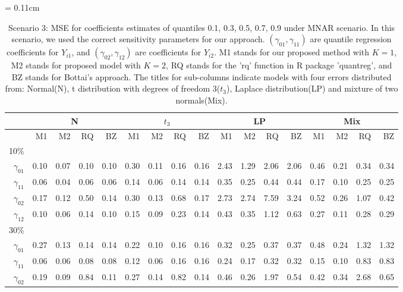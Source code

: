 \documentclass[useAMS,usenatbib,referee]{biom}
\begin{document}
  \begin{table}
\centering
    \caption{Scenario 3: MSE for coefficients estimates of quantiles 0.1, 0.3, 0.5, 0.7, 0.9 under MNAR scenario.
In this scenario, we used the correct sensitivity parameters for our approach.
$(\gamma_{01}, \gamma_{11})$ are quantile regression coefficients for $Y_{i1}$, and $(\gamma_{02}, \gamma_{12})$ are coefficients for $Y_{i2}$. M1 stands for our proposed method with $K = 1$, M2 stands for proposed model with $K = 2$, RQ stands for the 'rq' function in R package 'quantreg', and BZ stands for Bottai's approach.
The titles for sub-columns indicate models with four errors distributed from: Normal(N), t distribution with degrees of freedom 3($t_3$),
Laplace distribution(LP) and mixture of two normals(Mix).
}\label{tab:sim3}
    \vspace{10pt} \tabcolsep = 0.11cm
    \begin{tabular}{rrrrrrrrrrrrrrrrr}
      \hline
              & \multicolumn{4}{c}{N} & \multicolumn{4}{c}{$t_3$}   & \multicolumn{4}{c}{LP}   & \multicolumn{4}{c}{Mix}   \\
      \hline
           & M1                      & M2 & RQ & BZ   & M1                      & M2 & RQ & BZ   & M1                      & M2 & RQ & BZ   & M1                      & M2 & RQ & BZ \\
10\%  \\
$\gamma_{01}$ & 0.10 & 0.07 & 0.10 & 0.10 & 0.30 & 0.11 & 0.16 & 0.16 & 2.43 & 1.29 & 2.06 & 2.06 & 0.46 & 0.21 & 0.34 & 0.34 \\
$\gamma_{11}$ & 0.06 & 0.04 & 0.06 & 0.06 & 0.14 & 0.06 & 0.14 & 0.14 & 0.35 & 0.25 & 0.44 & 0.44 & 0.17 & 0.10 & 0.25 & 0.25 \\
$\gamma_{02}$ & 0.17 & 0.12 & 0.50 & 0.14 & 0.30 & 0.13 & 0.68 & 0.17 & 2.73 & 2.74 & 7.59 & 3.24 & 0.52 & 0.26 & 1.07 & 0.42 \\
$\gamma_{12}$ & 0.10 & 0.06 & 0.14 & 0.10 & 0.15 & 0.09 & 0.23 & 0.14 & 0.43 & 0.35 & 1.12 & 0.63 & 0.27 & 0.11 & 0.28 & 0.29 \\
30\% \\
$\gamma_{01}$ & 0.27 & 0.13 & 0.14 & 0.14 & 0.22 & 0.10 & 0.16 & 0.16 & 0.32 & 0.25 & 0.37 & 0.37 & 0.48 & 0.24 & 1.32 & 1.32 \\
$\gamma_{11}$ & 0.06 & 0.06 & 0.08 & 0.08 & 0.12 & 0.06 & 0.16 & 0.16 & 0.24 & 0.17 & 0.32 & 0.32 & 0.15 & 0.10 & 0.83 & 0.83 \\
$\gamma_{02}$ & 0.19 & 0.09 & 0.84 & 0.11 & 0.27 & 0.14 & 0.82 & 0.14 & 0.46 & 0.26 & 1.97 & 0.54 & 0.42 & 0.34 & 2.68 & 0.65 \\

\end{tabular}
\end{table}
\end{document}
